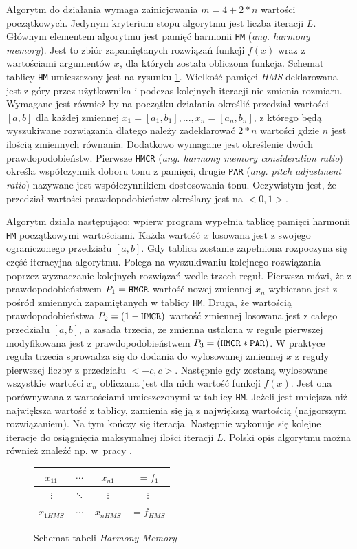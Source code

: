 \documentclass[10pt, a4paper]{article}
\begin{document}
Algorytm do działania wymaga zainicjowania {\em $m=4+2*n$} wartości początkowych. Jedynym kryterium stopu algorytmu jest liczba iteracji $L$. Głównym elementem algorytmu jest pamięć harmonii {\tt HM} ({\em ang. harmony memory}). Jest to zbiór zapamiętanych rozwiązań funkcji $f(x)$ wraz z wartościami argumentów $x$, dla których została obliczona funkcja. Schemat tablicy {\tt HM} umieszczony jest na rysunku \ref{tab:1}. Wielkość pamięci {\em HMS} deklarowana jest z góry przez użytkownika i podczas kolejnych iteracji nie zmienia rozmiaru. Wymagane jest również by na początku działania określić przedział wartości $[a,b]$ dla każdej zmiennej $x_{1}=[a_{1},b_{1}], ... ,x_{n}=[a_{n},b_{n}]$, z którego będą wyszukiwane rozwiązania dlatego należy zadeklarować $2*n$ wartości gdzie $n$ jest ilością zmiennych równania. Dodatkowo wymagane jest określenie dwóch prawdopodobieństw. Pierwsze {\tt HMCR} ({\em ang. harmony memory consideration ratio}) określa współczynnik doboru tonu z pamięci, drugie {\tt PAR} ({\em ang. pitch adjustment ratio}) nazywane jest współczynnikiem dostosowania tonu. Oczywistym jest, że przedział wartości prawdopodobieństw określany jest na $<0,1>$.

Algorytm działa następująco: wpierw program wypełnia tablicę pamięci harmonii {\tt HM} początkowymi wartościami. Każda wartość $x$ losowana jest z swojego ograniczonego przedziału $[a,b]$. Gdy tablica zostanie zapełniona rozpoczyna się część iteracyjna algorytmu. Polega na wyszukiwaniu kolejnego rozwiązania poprzez wyznaczanie kolejnych rozwiązań wedle trzech reguł. Pierwsza mówi, że z prawdopodobieństwem $P_{1}={\tt HMCR}$ wartość nowej zmiennej $x_{n}$ wybierana jest z pośród zmiennych zapamiętanych w tablicy {\tt HM}. Druga, że wartością prawdopodobieństwa $P_{2}=(1-{\tt HMCR})$ wartość zmiennej losowana jest z całego przedziału $[a,b]$, a zasada trzecia, że zmienna ustalona w regule pierwszej modyfikowana jest z prawdopodobieństwem $P_{3}=({\tt HMCR}*{\tt PAR})$. W praktyce reguła trzecia sprowadza się do dodania do wylosowanej zmiennej $x$ z reguły pierwszej liczby z przedziału $<-c,c>$. Następnie gdy zostaną wylosowane wszystkie wartości $x_{n}$ obliczana jest dla nich wartość funkcji $f(x)$. Jest ona porównywana z wartościami umieszczonymi w tablicy {\tt HM}. Jeżeli jest mniejsza niż największa wartość z tablicy, zamienia się ją z największą wartością (najgorszym rozwiązaniem). Na tym kończy się iteracja. Następnie wykonuje się kolejne iteracje do osiągnięcia maksymalnej ilości iteracji {\em $L$}. Polski opis algorytmu można również znaleźć np. w~pracy \cite{bib:tlumaczenie}.
\begin{figure}[h]
\begin{tabular}{|ccc|c|}
	\hline 
	$x_{11}$ & $\cdots$ & $x_{n1}$ & $=f_{1}$\\ 
	\hline 
	$\vdots$ & $\ddots$ & $\vdots$ & $\vdots$\\ 
	\hline 
	$x_{1HMS}$ & $\cdots$ & $x_{nHMS}$ & $=f_{HMS}$\\ 
	\hline 
\end{tabular}
	\centering
	\caption{Schemat tabeli {\em Harmony Memory}}
	\label{tab:1}
\end{figure}
\end{document}
